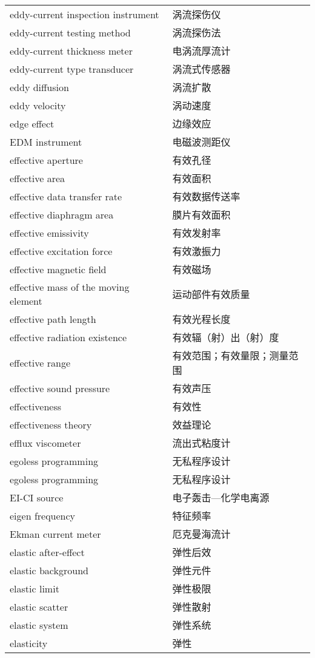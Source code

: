 \documentclass[
]{article}
\begin{document}
\begin{longtable}[]{@{}ll@{}}
eddy-current inspection instrument & 涡流探伤仪 \\
eddy-current testing method & 涡流探伤法 \\
eddy-current thickness meter & 电涡流厚流计 \\
eddy-current type transducer & 涡流式传感器 \\
eddy diffusion & 涡流扩散 \\
eddy velocity & 涡动速度 \\
edge effect & 边缘效应 \\
EDM instrument & 电磁波测距仪 \\
effective aperture & 有效孔径 \\
effective area & 有效面积 \\
effective data transfer rate & 有效数据传送率 \\
effective diaphragm area & 膜片有效面积 \\
effective emissivity & 有效发射率 \\
effective excitation force & 有效激振力 \\
effective magnetic field & 有效磁场 \\
effective mass of the moving element & 运动部件有效质量 \\
effective path length & 有效光程长度 \\
effective radiation existence & 有效辐（射）出（射）度 \\
effective range & 有效范围；有效量限；测量范围 \\
effective sound pressure & 有效声压 \\
effectiveness & 有效性 \\
effectiveness theory & 效益理论 \\
efflux viscometer & 流出式粘度计 \\
egoless programming & 无私程序设计 \\
egoless programming & 无私程序设计 \\
EI-CI source & 电子轰击---化学电离源 \\
eigen frequency & 特征频率 \\
Ekman current meter & 厄克曼海流计 \\
elastic after-effect & 弹性后效 \\
elastic background & 弹性元件 \\
elastic limit & 弹性极限 \\
elastic scatter & 弹性散射 \\
elastic system & 弹性系统 \\
elasticity & 弹性 \\

\end{longtable}
\end{document}
